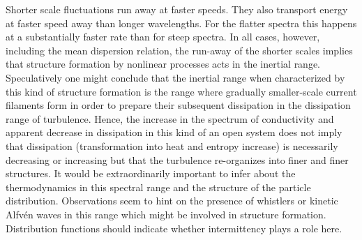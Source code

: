 \documentclass[ ]{copernicus2}
\begin{document}
{{{{{Shorter scale fluctuations run away at faster speeds. They also transport energy at faster speed away than longer wavelengths. For the flatter spectra this happens at a substantially faster rate than for steep spectra. In all cases, however, including the mean dispersion relation, the run-away of the shorter scales implies that structure formation by nonlinear processes acts in the inertial range. Speculatively one might conclude that the inertial range when characterized by this kind of structure formation is the range where gradually smaller-scale current filaments form in order to prepare their subsequent dissipation in the dissipation range of turbulence. Hence, the increase in the spectrum of conductivity and apparent decrease in dissipation in this kind of an open system does not imply that dissipation (transformation into heat and entropy increase) is necessarily decreasing or increasing but that the turbulence re-organizes into finer and finer structures. It would be extraordinarily important to infer about the thermodynamics in this spectral range and the structure of the particle distribution. Observations \citep{bale2005} seem to hint on the presence of whistlers or kinetic Alfv\'en waves in this range which might be involved in structure formation. Distribution functions should indicate whether intermittency plays a role here.}}

}}}
\end{document}
